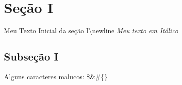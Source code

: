 \documentclass{article}%
\begin{document}
%
\normalsize%
\section{Seção I}%
\label{sec:SeoI}%
Meu Texto Inicial da seção I\textbackslash{}newline%
\textit{ Meu texto em Itálico}%
\subsection{Subseção I}%
\label{subsec:SubseoI}%
Alguns caracteres malucos: \$\&\#\{\}

%
\end{document}
